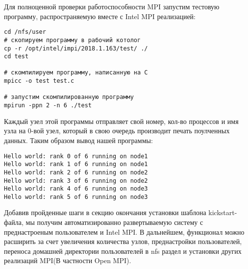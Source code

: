 Для полноценной проверки работоспособности MPI запустим
тестовую программу, распространяемую вместе с Intel MPI
реализацией:
\begin{verbatim}
cd /nfs/user
# скопируем программу в рабочий котолог
cp -r /opt/intel/impi/2018.1.163/test/ ./
cd test

# скомпилируем программу, написанную на C
mpicc -o test test.c

# запустим скомпилированную программу
mpirun -ppn 2 -n 6 ./test
\end{verbatim}

Каждый узел этой программы отправляет свой номер, кол-во 
процессов и имя узла на 0-вой узел, который в свою очередь
производит печать поулченных данных. Таким образом
вывод нашей программы:
\begin{verbatim}
Hello world: rank 0 of 6 running on node1
Hello world: rank 1 of 6 running on node1
Hello world: rank 2 of 6 running on node2
Hello world: rank 3 of 6 running on node2
Hello world: rank 4 of 6 running on node3
Hello world: rank 5 of 6 running on node3
\end{verbatim}

Добавив пройденные шаги в секцию окончания установки шаблона
kickstart-файла, мы получим автоматизированно развертываемую
систему с преднастроеным пользователем и Intel MPI. 
В дальнейшем, функционал можно расширить за счет 
увеличения количества узлов, преднастройки
пользователей, переноса домашней директории пользователей
в nfs раздел и установки других реализаций MPI(В частности Open MPI).